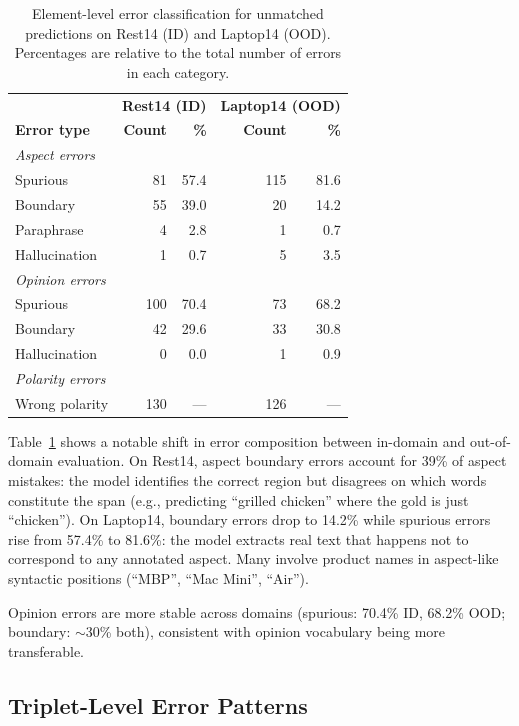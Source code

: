 \documentclass[12pt,a4paper]{report}
\begin{document}
\begin{table}[H]
\centering
\caption{Element-level error classification for unmatched predictions on Rest14 (ID) and Laptop14 (OOD). Percentages are relative to the total number of errors in each category.}
\label{tab:errors-element}
\small
\begin{tabular}{@{}lrrrr@{}}
\toprule
& \multicolumn{2}{c}{\textbf{Rest14 (ID)}} & \multicolumn{2}{c}{\textbf{Laptop14 (OOD)}} \\
\textbf{Error type} & \textbf{Count} & \textbf{\%} & \textbf{Count} & \textbf{\%} \\
\midrule
\multicolumn{5}{l}{\textit{Aspect errors}} \\
\midrule
Spurious & 81 & 57.4 & 115 & 81.6 \\
Boundary & 55 & 39.0 & 20 & 14.2 \\
Paraphrase & 4 & 2.8 & 1 & 0.7 \\
Hallucination & 1 & 0.7 & 5 & 3.5 \\
\midrule
\multicolumn{5}{l}{\textit{Opinion errors}} \\
\midrule
Spurious & 100 & 70.4 & 73 & 68.2 \\
Boundary & 42 & 29.6 & 33 & 30.8 \\
Hallucination & 0 & 0.0 & 1 & 0.9 \\
\midrule
\multicolumn{5}{l}{\textit{Polarity errors}} \\
\midrule
Wrong polarity & 130 & --- & 126 & --- \\
\bottomrule
\end{tabular}
\end{table}

Table~\ref{tab:errors-element} shows a notable shift in error composition between in-domain and out-of-domain evaluation. On Rest14, aspect boundary errors account for 39\% of aspect mistakes: the model identifies the correct region but disagrees on which words constitute the span (e.g., predicting ``grilled chicken'' where the gold is just ``chicken''). On Laptop14, boundary errors drop to 14.2\% while spurious errors rise from 57.4\% to 81.6\%: the model extracts real text that happens not to correspond to any annotated aspect. Many involve product names in aspect-like syntactic positions (``MBP'', ``Mac Mini'', ``Air'').

Opinion errors are more stable across domains (spurious: 70.4\% ID, 68.2\% OOD; boundary: $\sim$30\% both), consistent with opinion vocabulary being more transferable.

\subsection{Triplet-Level Error Patterns}
\end{document}
